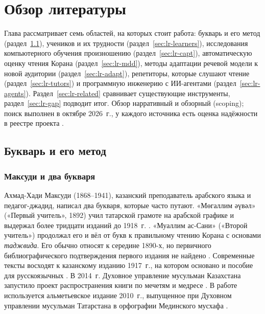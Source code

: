 \chapter{Обзор литературы}\label{ch:review}

Глава рассматривает семь областей, на которых стоит работа: букварь и его метод
(раздел~\ref{sec:lr-primer}), учеников и их трудности (раздел~\ref{sec:lr-learners}), исследования
компьютерного обучения произношению (раздел~\ref{sec:lr-capt}), автоматическую оценку чтения Корана
(раздел~\ref{sec:lr-mdd}), методы адаптации речевой модели к новой аудитории (раздел~\ref{sec:lr-adapt}),
репетиторы, которые слушают чтение (раздел~\ref{sec:lr-tutors}) и программную
инженерию с ИИ-агентами (раздел~\ref{sec:lr-agents}).
Раздел~\ref{sec:lr-related} сравнивает существующие инструменты, раздел~\ref{sec:lr-gap} подводит итог.
Обзор нарративный и обзорный (scoping); поиск выполнен в октябре 2026~г., у каждого источника есть
оценка надёжности в реестре проекта \cite{SRC-038}.

\section{Букварь и его метод}\label{sec:lr-primer}

\subsection{Максуди и два букваря}

Ахмад-Хади Максуди (1868--1941), казанский преподаватель арабского языка и педагог-джадид, написал два
букваря, которые часто путают. «Мөгаллим әүвәл» («Первый учитель», 1892) учил татарской грамоте на
арабской графике и выдержал более тридцати изданий до 1918~г. \cite{SRC-015,SRC-019}. «Муаллим ас-Сани»
(«Второй учитель») продолжал его и вёл от букв к правильному чтению Корана с основами \emph{таджвида}.
Его обычно относят к середине 1890-х, но первичного библиографического подтверждения первого издания не
найдено \cite{SRC-018}. Современные тексты восходят к казанскому изданию 1917~г., на котором основано и
пособие для русскоязычных \cite{SRC-024}. В 2014~г. Духовное управление мусульман Казахстана запустило
проект распространения книги по мечетям и медресе \cite{SRC-020}. В работе используется альметьевское
издание 2010~г., выпущенное при Духовном управлении мусульман Татарстана в орфографии Мединского мусхафа
\cite{SRC-040}.

